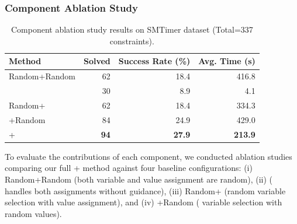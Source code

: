 \subsubsection{Component Ablation Study}

\begin{table}
\centering
\caption{Component ablation study results on SMTimer dataset (Total=337 constraints).}
\label{tab:RQ3-ablation}
\begin{tabular}{lrrr}
\toprule
Method & Solved & Success Rate (\%) & Avg. Time (s) \\
\midrule
Random+Random & 62 & 18.4 & 416.8 \\
\LLM{} & 30 & 8.9 & 4.1 \\
Random+\LLM{} & 62 & 18.4 & 334.3 \\
\RL{}+Random & 84 & 24.9 & 429.0 \\
\RL{}+\LLM{} & \textbf{94} & \textbf{27.9} & \textbf{213.9} \\
\bottomrule
\end{tabular}
\end{table}

To evaluate the contributions of each component, we conducted ablation studies comparing our full \RL{}+\LLM{} method against four baseline configurations: (i) Random+Random (both variable and value assignment are random), (ii) \LLM{} (\LLM{} handles both assignments without \RL{} guidance), (iii) Random+\LLM{} (random variable selection with \LLM{} value assignment), and (iv) \RL{}+Random (\RL{} variable selection with random values). 


